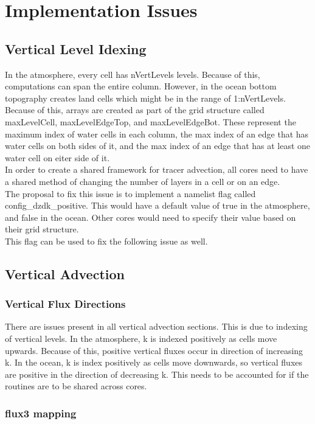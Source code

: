\documentclass[11pt]{report}
\begin{document}
\chapter{Implementation Issues}

\section{Vertical Level Idexing}
In the atmosphere, every cell has nVertLevels levels. Because of this,
computations can span the entire column. However, in the ocean bottom
topography creates land cells which might be in the range of 1:nVertLevels.
Because of this, arrays are created as part of the grid structure called
maxLevelCell, maxLevelEdgeTop, and maxLevelEdgeBot. These represent the maximum
index of water cells in each column, the max index of an edge that has water
cells on both sides of it, and the max index of an edge that has at least one
water cell on eiter side of it.\\

In order to create a shared framework for tracer advection, all cores need to
have a shared method of changing the number of layers in a cell or on an edge. \\

The proposal to fix this issue is to implement a namelist flag called
config\_dzdk\_positive. This would have a default value of true in the
atmosphere, and false in the ocean. Other cores would need to specify their
value based on their grid structure. \\

This flag can be used to fix the following issue as well.

\section{Vertical Advection}
\subsection{Vertical Flux Directions}
There are issues present in all vertical advection sections. This is due to
indexing of vertical levels. In the atmosphere, k is indexed positively as
cells move upwards. Because of this, positive vertical fluxes occur in
direction of increasing k. In the ocean, k is index positively as cells move
downwards, so vertical fluxes are positive in the direction of decreasing k.
This needs to be accounted for if the routines are to be shared across cores.
\subsection{flux3 mapping}
\end{document}
